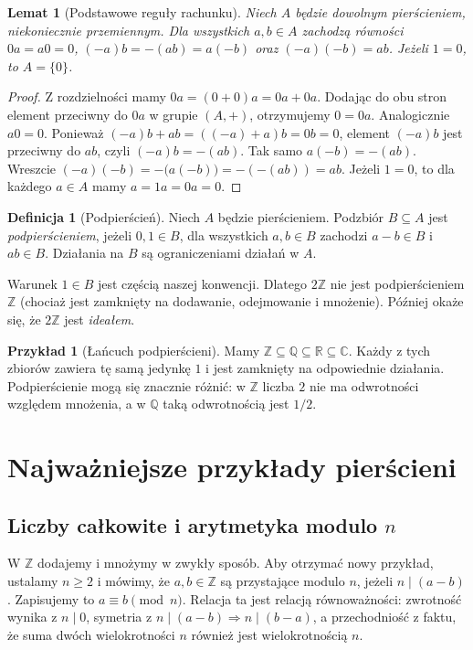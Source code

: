 \documentclass[11pt,a4paper,openany]{report}
\numberwithin{equation}{section}
\theoremstyle{plain}
\newtheorem{lemat}[twierdzenie]{Lemat}
\theoremstyle{definition}
\newtheorem{definicja}[twierdzenie]{Definicja}
\newtheorem{przyklad}[twierdzenie]{Przykład}
\theoremstyle{remark}
\newcommand{\Z}{\mathbb Z}
\newcommand{\Q}{\mathbb Q}
\newcommand{\R}{\mathbb R}
\newcommand{\C}{\mathbb C}
\begin{document}
\begin{lemat}[Podstawowe reguły rachunku]
\label{lem:reguly}
Niech $A$ będzie dowolnym pierścieniem, niekoniecznie przemiennym.
Dla wszystkich $a,b\in A$ zachodzą równości
$0a=a0=0$, $(-a)b=-(ab)=a(-b)$ oraz $(-a)(-b)=ab$.
Jeżeli $1=0$, to $A=\{0\}$.
\end{lemat}
\begin{proof}
Z rozdzielności mamy $0a=(0+0)a=0a+0a$.
Dodając do obu stron element przeciwny do $0a$ w grupie $(A,+)$,
otrzymujemy $0=0a$. Analogicznie $a0=0$.
Ponieważ $(-a)b+ab=((-a)+a)b=0b=0$, element $(-a)b$ jest przeciwny
do $ab$, czyli $(-a)b=-(ab)$. Tak samo $a(-b)=-(ab)$.
Wreszcie $(-a)(-b)=-\bigl(a(-b)\bigr)=-(-(ab))=ab$.
Jeżeli $1=0$, to dla każdego $a\in A$ mamy $a=1a=0a=0$.
\end{proof}

\begin{definicja}[Podpierścień]
Niech $A$ będzie pierścieniem. Podzbiór $B\subseteq A$ jest
\emph{podpierścieniem}, jeżeli $0,1\in B$, dla wszystkich $a,b\in B$
zachodzi $a-b\in B$ i $ab\in B$. Działania na $B$ są ograniczeniami
działań w $A$.
\end{definicja}

Warunek $1\in B$ jest częścią naszej konwencji. Dlatego $2\Z$ nie jest
podpierścieniem $\Z$ (chociaż jest zamknięty na dodawanie, odejmowanie
i mnożenie). Później okaże się, że $2\Z$ jest \emph{ideałem}.

\begin{przyklad}[Łańcuch podpierścieni]
Mamy $\Z\subseteq\Q\subseteq\R\subseteq\C$.
Każdy z tych zbiorów zawiera tę samą jedynkę $1$ i jest zamknięty
na odpowiednie działania. Podpierścienie mogą się znacznie różnić:
w $\Z$ liczba $2$ nie ma odwrotności względem mnożenia,
a w $\Q$ taką odwrotnością jest $1/2$.
\end{przyklad}

\section{Najważniejsze przykłady pierścieni}

\subsection{Liczby całkowite i arytmetyka modulo \texorpdfstring{$n$}{n}}

W $\Z$ dodajemy i mnożymy w zwykły sposób. Aby otrzymać nowy przykład,
ustalamy $n\ge2$ i mówimy, że $a,b\in\Z$ są przystające modulo $n$,
jeżeli $n\mid(a-b)$. Zapisujemy to $a\equiv b\pmod n$.
Relacja ta jest relacją równoważności: zwrotność wynika z $n\mid0$,
symetria z $n\mid(a-b)\Rightarrow n\mid(b-a)$,
a przechodniość z faktu, że suma dwóch wielokrotności $n$
również jest wielokrotnością $n$.
\end{document}
